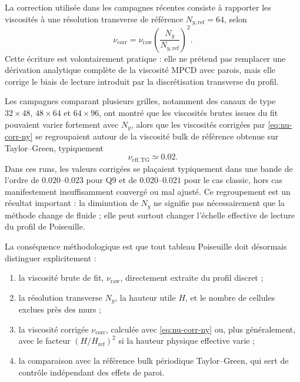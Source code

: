 \documentclass[11pt,a4paper]{article}
\begin{document}
La correction utilisée dans les campagnes récentes consiste à rapporter les viscosités à une résolution transverse de référence \(N_{y,\mathrm{ref}}=64\), selon
\begin{equation}
  \nu_{\mathrm{corr}}
  =
  \nu_{\mathrm{raw}}
  \left(\frac{N_y}{N_{y,\mathrm{ref}}}\right)^2.
  \label{eq:nu-corr-ny}
\end{equation}
Cette écriture est volontairement pratique : elle ne prétend pas remplacer une dérivation analytique complète de la viscosité MPCD avec parois, mais elle corrige le biais de lecture introduit par la discrétisation transverse du profil.

Les campagnes comparant plusieurs grilles, notamment des canaux de type \(32\times48\), \(48\times64\) et \(64\times96\), ont montré que les viscosités brutes issues du fit pouvaient varier fortement avec \(N_y\), alors que les viscosités corrigées par \eqref{eq:nu-corr-ny} se regroupaient autour de la viscosité bulk de référence obtenue sur Taylor--Green, typiquement
\begin{equation}
  \nu_{\mathrm{eff,TG}} \simeq 0.02.
\end{equation}
Dans ces runs, les valeurs corrigées se plaçaient typiquement dans une bande de l'ordre de \(0.020\)--\(0.023\) pour Q9 et de \(0.020\)--\(0.021\) pour le cas classic, hors cas manifestement insuffisamment convergé ou mal ajusté. Ce regroupement est un résultat important : la diminution de \(N_y\) ne signifie pas nécessairement que la méthode change de fluide ; elle peut surtout changer l'échelle effective de lecture du profil de Poiseuille.

La conséquence méthodologique est que tout tableau Poiseuille doit désormais distinguer explicitement :
\begin{enumerate}[label=\roman*)]
  \item la viscosité brute de fit, \(\nu_{\mathrm{raw}}\), directement extraite du profil discret ;
  \item la résolution transverse \(N_y\), la hauteur utile \(H\), et le nombre de cellules exclues près des murs ;
  \item la viscosité corrigée \(\nu_{\mathrm{corr}}\), calculée avec \eqref{eq:nu-corr-ny} ou, plus généralement, avec le facteur \((H/H_{\mathrm{ref}})^2\) si la hauteur physique effective varie ;
  \item la comparaison avec la référence bulk périodique Taylor--Green, qui sert de contrôle indépendant des effets de paroi.
\end{enumerate}
\end{document}
